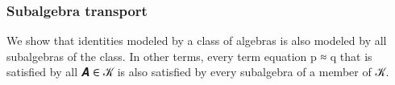 \subsubsection{Subalgebra transport}\label{subalgebra-transport}
We show that identities modeled by a class of algebras is also modeled by all subalgebras of the class. In other terms, every term equation \ab p \aof ≈ \ab q that is satisfied by all \ab 𝑨 \aof ∈ \ab 𝒦 is also satisfied by every subalgebra of a member of \ab 𝒦.
\ccpad
\begin{code}%
\>[0]\AgdaSpace{}%
\<%
\\
\>[0][@{}l@{\AgdaIndent{0}}]%
\>[1]%
\>[338I]\AgdaSymbol{:}\AgdaSpace{}%
\AgdaSymbol{\{}\AgdaSpace{}%
\AgdaSpace{}%
\AgdaSpace{}%
\AgdaSymbol{:}\AgdaSpace{}%
\AgdaSymbol{\}\{}\AgdaSpace{}%
\AgdaSymbol{:}\AgdaSpace{}%
\AgdaSpace{}%
\AgdaSymbol{\}}\<%
\\
\>[338I][@{}l@{\AgdaIndent{0}}]%
\>[34]\AgdaSymbol{\{}\AgdaSpace{}%
\AgdaSymbol{:}\AgdaSpace{}%
\AgdaSpace{}%
\AgdaSymbol{(}\AgdaSpace{}%
\AgdaSpace{}%
\AgdaSymbol{)}\AgdaSpace{}%
\AgdaSymbol{(}\AgdaSpace{}%
\AgdaSymbol{)\}}\<%
\\
%
\>[34]\AgdaSymbol{(}\AgdaSpace{}%
\AgdaSpace{}%
\AgdaSymbol{:}\AgdaSpace{}%
\AgdaSymbol{\{}\AgdaSymbol{\}\{}\AgdaSymbol{\})}\<%
\\
%
\>[34]\AgdaSymbol{(}\AgdaSpace{}%
\AgdaSymbol{:}\AgdaSpace{}%
\AgdaSymbol{\{}\AgdaSymbol{\}\{}\AgdaSymbol{\}}\AgdaSpace{}%
\AgdaSymbol{)}\<%
\\
%
\>[1]%
\>[34]\AgdaSpace{}%
\AgdaSpace{}%
\AgdaSpace{}%
\AgdaSpace{}%
\<%
\\
%
\>[34]\AgdaComment{-------------}\<%
\\
%
\>[1]%
\>[34]\AgdaSpace{}%
\AgdaSpace{}%
\AgdaSpace{}%
\AgdaSpace{}%
\AgdaSpace{}%
\AgdaSpace{}%
\<%

\end{code}
